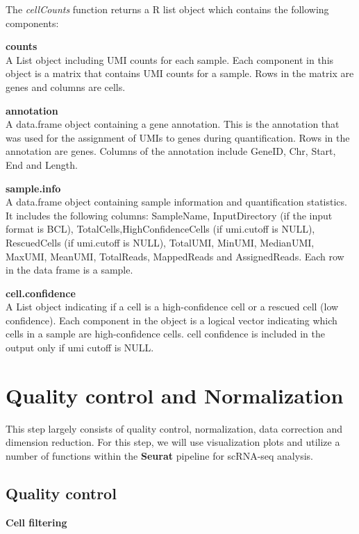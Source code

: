 \documentclass[
  openany]{book}
\begin{document}
The \emph{cellCounts} function returns a R list object which contains the following components:

\textbf{counts}\\
A List object including UMI counts for each sample. Each component in this object is a matrix that contains UMI counts for a sample. Rows in the matrix are genes and columns are cells.

\textbf{annotation}\\
A data.frame object containing a gene annotation. This is the annotation that was used for the assignment of UMIs to genes during quantification. Rows in the annotation are genes. Columns of the annotation include GeneID, Chr, Start, End and Length.

\textbf{sample.info}\\
A data.frame object containing sample information and quantification statistics. It includes the following columns: SampleName, InputDirectory (if the input format is BCL), TotalCells,HighConfidenceCells (if umi.cutoff is NULL), RescuedCells (if umi.cutoff is NULL), TotalUMI, MinUMI, MedianUMI, MaxUMI, MeanUMI, TotalReads, MappedReads and AssignedReads. Each row in the data frame is a sample.

\textbf{cell.confidence}\\
A List object indicating if a cell is a high-confidence cell or a rescued cell (low confidence). Each component in the object is a logical vector indicating which cells in a sample are high-confidence cells. cell confidence is included in the output only if umi cutoff is NULL.

\hypertarget{quality-control-and-normalization}{%
\section{Quality control and Normalization}\label{quality-control-and-normalization}}

This step largely consists of quality control, normalization, data correction and dimension reduction. For this step, we will use visualization plots and utilize a number of functions within the \textbf{Seurat} \citep{hao2021} pipeline for scRNA-seq analysis.

\hypertarget{quality-control}{%
\subsection{Quality control}\label{quality-control}}

\textbf{Cell filtering}\\
\end{document}
